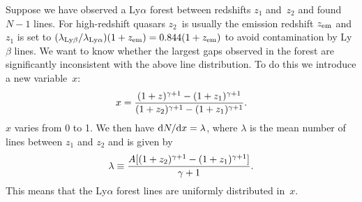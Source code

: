 \documentclass[useAMS,usenatbib]{biom}
\begin{document}
Suppose we have observed a Ly$\alpha$ forest between redshifts $z_1$
and~$z_2$ and found $N-1$ lines.  For high-redshift quasars $z_2$~is
usually the emission redshift $z_{{\mathrm{em}}}$ and $z_1$ is set to
$(\lambda_{{\mathrm{Ly}}\beta}/\lambda_{{\mathrm{Ly}}\alpha})(1+z_{{\mathrm{em}}})=0.844
(1+z_{{\mathrm{em}}})$ to avoid contamination by Ly$\beta$ lines.  We
want to know whether the largest gaps observed in the forest are
significantly inconsistent with the above line distribution.  To do
this we introduce a new variable~$x$:\vspace*{1.5pt}
%
\[
x={(1+z)^{\gamma+1}-(1+z_1)^{\gamma+1} \over
     (1+z_2)^{\gamma+1}-(1+z_1)^{\gamma+1}}.
\]
\vskip1.5pt%
$x$ varies from 0 to 1.  We then have ${\mathrm{d}}N/{\mathrm{d}}x=\lambda$,
where $\lambda$ is the mean number of lines between $z_1$ and $z_2$
and is given by
%
\[%
\lambda\equiv{A[(1+z_2)^{\gamma+1}-(1+z_1)^{\gamma+1}]\over\gamma+1}.
\]
%
This means that the Ly$\alpha$ forest lines are uniformly
distributed in~$x$.
%
\label{lastpage}
\end{document}
